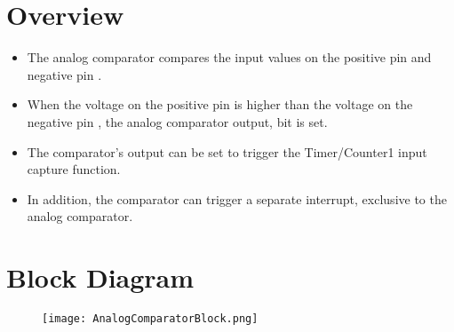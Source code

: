 \documentclass{article}
\begin{document}

\section{Overview}
\begin{itemize}
    \item The analog comparator compares the input values on the positive pin  and negative pin .
    \item When the voltage on the positive pin  is higher than the voltage on the negative pin , the analog comparator output,  bit is set.
    \item The comparator’s output can be set to trigger the Timer/Counter1 input capture function.
    \item In addition, the comparator can trigger a separate interrupt, exclusive to the analog comparator. 
\end{itemize}
\section{Block Diagram}
\begin{figure}[H]
    \centering
    \texttt{[image: AnalogComparatorBlock.png]}
\end{figure}
\end{document}
